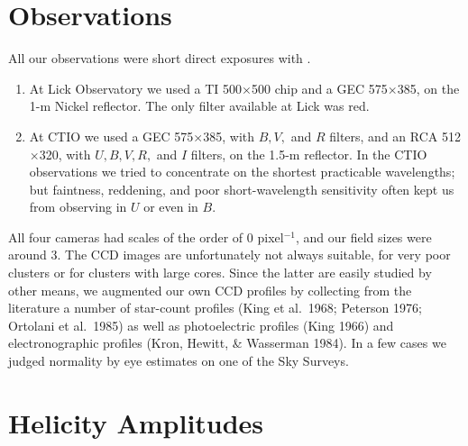 \documentclass[11pt,twoside]{article}  %
\begin{document}
\section{Observations}


All our observations were short direct exposures with
.

\begin{enumerate}
\item At Lick Observatory we used a TI 500$\times$500 chip 
and a GEC 575$\times$385, on the 1-m Nickel reflector.  The only
filter available at Lick was red.
\item At CTIO we used a GEC 575$\times$385, with
$B, V,$ and $R$ filters, and an RCA 512$\times$320, with $U, B, V, R,$
and $I$ filters, on the 1.5-m reflector. In the CTIO observations we
tried to concentrate on the shortest practicable wavelengths; but
faintness, reddening, and poor short-wavelength sensitivity often kept
us from observing in $U$ or even in $B$.
\end{enumerate}

All four cameras had scales of the order of 0 pixel$^{-1}$, and our
field sizes were around 3\arcmin.
%
The CCD images are unfortunately not always suitable, for very poor
clusters or for clusters with large cores.  Since the latter are
easily studied by other means, we augmented our own CCD profiles by
collecting from the literature a number of star-count profiles (King
et al.\ 1968; Peterson 1976; Ortolani et al.\ 1985) as well as
photoelectric profiles (King 1966) and electronographic profiles (Kron,
Hewitt, \& Wasserman 1984).  In a few cases we judged normality by eye estimates on
one of the Sky Surveys.


\section{Helicity Amplitudes}
\end{document}
